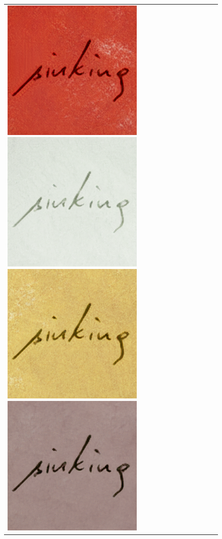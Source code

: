 \begin{figure}
\begin{tabular}{lc}
{  \includegraphics[scale=0.18]{../assets/background_style_transfer/spade/result/45.png}%
  \includegraphics[scale=0.18]{../assets/background_style_transfer/spade/result/46.png}%
  \includegraphics[scale=0.18]{../assets/background_style_transfer/spade/result/49.png}%
  \includegraphics[scale=0.18]{../assets/background_style_transfer/spade/result/31.png}%
}
\end{tabular}
\end{figure}
